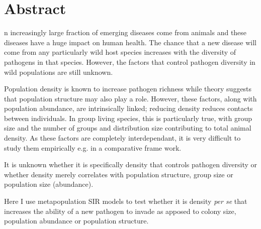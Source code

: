 










\section{Abstract}


n increasingly large fraction of emerging diseases come from animals \cite{jones2008global, taylor2001risk} and these diseases have a huge impact on human health.
The chance that a new disease will come from any particularly wild host species increases with the diversity of pathogens in that species.
However, the factors that control pathogen diversity in wild populations are still unknown.



Population density is known to increase pathogen richness while theory suggests that population structure may also play a role.
However, these factors, along with population abundance, are intrinsically linked; reducing density reduces contacts between individuals.
In group living species, this is particularly true, with group size and the number of groups and distribution size contributing to total animal density. 
As these factors are completely interdependant, it is very difficult to study them empirically e.g. in a comparative frame work.


It is unknown whether it is specifically density that controls pathogen diversity or whether density merely correlates with population structure, group size or population size (abundance).


Here I use metapopulation SIR models to test whether it is density \emph{per se} that increases the ability of a new pathogen to invade as apposed to colony size, population abundance or population structure.






